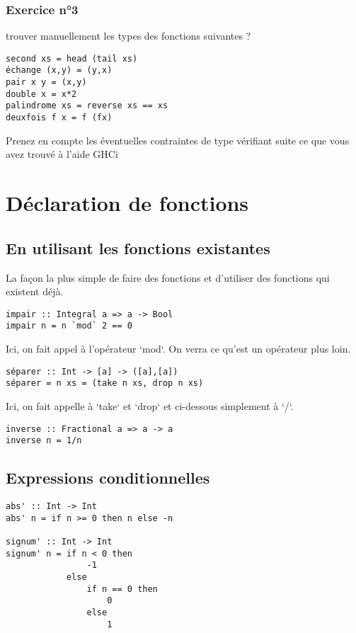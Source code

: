 \documentclass[11pt]{article}
\begin{document}
\subsubsection{Exercice n°3}
\label{sec:org57305f2}
trouver manuellement les types des fonctions suivantes ?

\begin{verbatim}
second xs = head (tail xs)
échange (x,y) = (y,x)
pair x y = (x,y)
double x = x*2
palindrome xs = reverse xs == xs
deuxfois f x = f (fx)
\end{verbatim}

Prenez en compte les éventuelles contraintes de type
vérifiant suite ce que vous avez trouvé à l'aide GHCi

\section{Déclaration de fonctions}
\label{sec:org62d6462}
\subsection{En utilisant les fonctions existantes}
\label{sec:orgb5077cd}
La façon la plus simple de faire des fonctions et d'utiliser  des fonctions qui existent déjà.
\begin{verbatim}
impair :: Integral a => a -> Bool
impair n = n `mod` 2 == 0
\end{verbatim}
Ici, on fait appel à l'opérateur `mod`.  On verra ce qu'est un opérateur plus loin.
\begin{verbatim}
séparer :: Int -> [a] -> ([a],[a])
séparer = n xs = (take n xs, drop n xs)
\end{verbatim}

Ici, on fait appelle à `take` et `drop` et ci-dessous simplement à `/`.

\begin{verbatim}
inverse :: Fractional a => a -> a
inverse n = 1/n
\end{verbatim}

\subsection{Expressions conditionnelles}
\label{sec:org39c540d}
\begin{verbatim}
abs' :: Int -> Int
abs' n = if n >= 0 then n else -n

signum' :: Int -> Int
signum' n = if n < 0 then 
                -1
            else
                if n == 0 then
                    0
                else
                    1
\end{verbatim}
\end{document}
